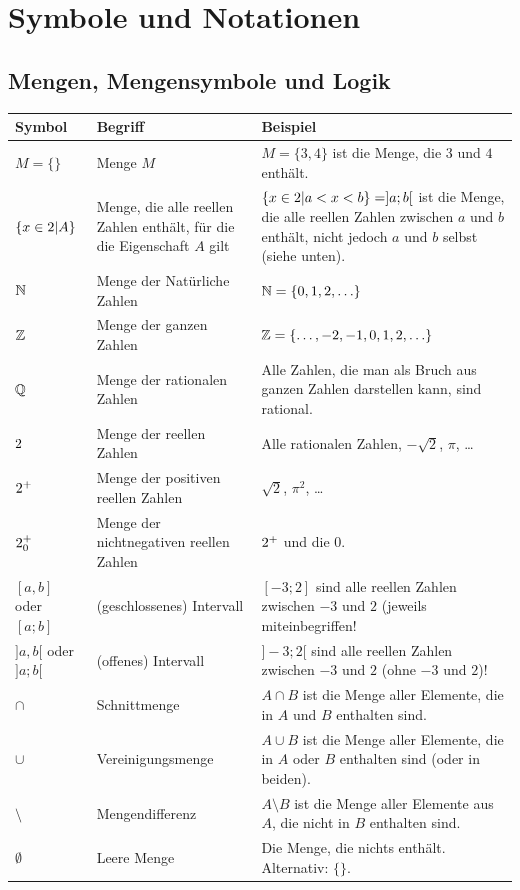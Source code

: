 \documentclass[ngerman, 12pt]{nssheetxea}
\begin{document}
\newpage
\section{Symbole und Notationen}
\subsection{Mengen, Mengensymbole und Logik}
\renewcommand{\arraystretch}{1.3}
\begin{tabularx}{\textwidth}{p{2cm} p{6.5cm} X}
Symbol & Begriff & Beispiel\\
\toprule
$M=\{ \}$ & Menge $M$ & $M=\{ 3, 4\}$ ist die Menge, die $3$ und $4$ enthält. \\
$\{ x \in 2 | A \}$ & Menge, die alle reellen Zahlen enthält, für die die Eigenschaft $A$ gilt & $\{ x \in 2 | a<x<b\}=]a;b[$ ist die Menge, die alle reellen Zahlen zwischen $a$ und $b$ enthält, nicht jedoch $a$ und $b$ selbst (siehe unten). \\
\midrule
$\mathbb{N}$ & Menge der Natürliche Zahlen & $\mathbb{N}=\{0,1,2,\ldots \}$ \\
$\mathbb{Z}$ & Menge der ganzen Zahlen	&	$\mathbb{Z}=\{\ldots , -2,-1,0,1,2, \ldots \}$	\\
$\mathbb{Q}$ & Menge der rationalen Zahlen	&	Alle Zahlen, die man als Bruch aus ganzen Zahlen darstellen kann, sind rational.\\
$2$ & Menge der reellen Zahlen	& Alle rationalen Zahlen, $-\sqrt{2}$, $\pi$, \ldots	\\
$2^+$	& Menge der positiven reellen Zahlen & $\sqrt{2}$, $\pi^2$, \ldots	\\
$2_0^+$ & Menge der nichtnegativen reellen Zahlen & $2^+$ und die $0$. \\
$[a,b]$ oder $[a;b]$ & (geschlossenes) Intervall & $[-3;2]$ sind alle reellen Zahlen zwischen $-3$ und $2$ (jeweils miteinbegriffen! \\
$]a,b[$ oder $]a;b[$ & (offenes) Intervall & $]-3;2[$ sind alle reellen Zahlen zwischen $-3$ und $2$ (ohne $-3$ und $2$)! \\
\midrule 
$\cap$ & Schnittmenge & $A\cap B$ ist die Menge aller Elemente, die in $A$ und $B$ enthalten sind. \\
$\cup$ & Vereinigungsmenge & $A\cup B$ ist die Menge aller Elemente, die in $A$ oder $B$ enthalten sind (oder in beiden). \\
$\setminus$ & Mengendifferenz & $A\setminus B$ ist die Menge aller Elemente aus $A$, die nicht in $B$ enthalten sind. \\
$\emptyset$ & Leere Menge & Die Menge, die nichts enthält. Alternativ: $\{\}$.\\

\end{tabularx}
\end{document}
